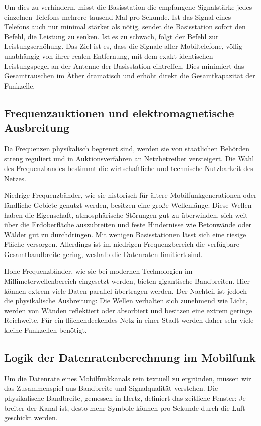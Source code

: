 \documentclass[11pt,a4paper]{article}
\begin{document}
Um dies zu verhindern, misst die Basisstation die empfangene Signalstärke jedes einzelnen Telefons mehrere tausend Mal pro Sekunde. Ist das Signal eines Telefons auch nur minimal stärker als nötig, sendet die Basisstation sofort den Befehl, die Leistung zu senken. Ist es zu schwach, folgt der Befehl zur Leistungserhöhung. Das Ziel ist es, dass die Signale aller Mobiltelefone, völlig unabhängig von ihrer realen Entfernung, mit dem exakt identischen Leistungspegel an der Antenne der Basisstation eintreffen. Dies minimiert das Gesamtrauschen im Äther dramatisch und erhöht direkt die Gesamtkapazität der Funkzelle.

\subsection{Frequenzauktionen und elektromagnetische Ausbreitung}

Da Frequenzen physikalisch begrenzt sind, werden sie von staatlichen Behörden streng reguliert und in Auktionsverfahren an Netzbetreiber versteigert. Die Wahl des Frequenzbandes bestimmt die wirtschaftliche und technische Nutzbarkeit des Netzes.

Niedrige Frequenzbänder, wie sie historisch für ältere Mobilfunkgenerationen oder ländliche Gebiete genutzt werden, besitzen eine große Wellenlänge. Diese Wellen haben die Eigenschaft, atmosphärische Störungen gut zu überwinden, sich weit über die Erdoberfläche auszubreiten und feste Hindernisse wie Betonwände oder Wälder gut zu durchdringen. Mit wenigen Basisstationen lässt sich eine riesige Fläche versorgen. Allerdings ist im niedrigen Frequenzbereich die verfügbare Gesamtbandbreite gering, weshalb die Datenraten limitiert sind.

Hohe Frequenzbänder, wie sie bei modernen Technologien im Millimeterwellenbereich eingesetzt werden, bieten gigantische Bandbreiten. Hier können extrem viele Daten parallel übertragen werden. Der Nachteil ist jedoch die physikalische Ausbreitung: Die Wellen verhalten sich zunehmend wie Licht, werden von Wänden reflektiert oder absorbiert und besitzen eine extrem geringe Reichweite. Für ein flächendeckendes Netz in einer Stadt werden daher sehr viele kleine Funkzellen benötigt.

\subsection{Logik der Datenratenberechnung im Mobilfunk}

Um die Datenrate eines Mobilfunkkanals rein textuell zu ergründen, müssen wir das Zusammenspiel aus Bandbreite und Signalqualität verstehen. Die physikalische Bandbreite, gemessen in Hertz, definiert das zeitliche Fenster: Je breiter der Kanal ist, desto mehr Symbole können pro Sekunde durch die Luft geschickt werden. 
\end{document}
